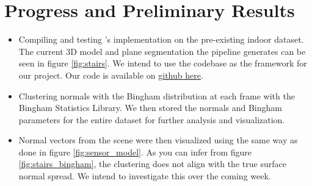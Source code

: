 \documentclass[12pt]{article}
\begin{document}
\section*{Progress and Preliminary Results}

\begin{itemize}
\item Compiling and testing \cite{kaess2015simultaneous}'s implementation on the pre-existing indoor dataset. The current 3D model and plane segmentation the pipeline generates can be seen in figure \ref{fig:stairs}. We intend to use the codebase as the framework for our project. 
Our code is available on \href{https://github.com/madratman/planar_bmm}{github here}.

\item Clustering normals with the Bingham distribution at each frame with the Bingham Statistics Library. We then stored the normals and Bingham parameters for the entire dataset for further analysis and visualization.


\item Normal vectors from the scene were then visualized using the same way as done in figure \ref{fig:sensor_model}. As you can infer from figure \ref{fig:stairs_bingham}, the clustering does not align with the true surface normal spread. We intend to investigate this over the coming week. 


\end{itemize}
\end{document}

